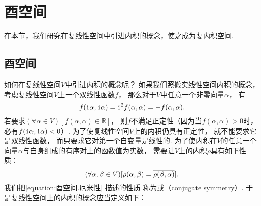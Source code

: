 \section{酉空间}
在本节，我们研究在复线性空间中引进内积的概念，使之成为复内积空间.

\subsection{酉空间}
如何在复线性空间\(V\)中引进内积的概念呢？
如果我们照搬实线性空间内积的概念，
考虑复线性空间\(V\)上一个双线性函数\(f\)，
那么对于\(V\)中任意一个非零向量\(\alpha\)，
有\begin{equation*}
	f(\kern1pt\mathrm{i}\kern1pt\alpha,\kern1pt\mathrm{i}\kern1pt\alpha)
	= \kern1pt\mathrm{i}\kern1pt^2 f(\alpha,\alpha)
	= -f(\alpha,\alpha).
\end{equation*}
若要求\((\forall \alpha \in V)[f(\alpha,\alpha) \in \mathbb{R}]\)，
则\(f\)不满足正定性（因为当\(f(\alpha,\alpha) > 0\)时，必有\(f(\kern1pt\mathrm{i}\kern1pt\alpha,\kern1pt\mathrm{i}\kern1pt\alpha) < 0\)）.
为了使复线性空间\(V\)上的内积仍具有正定性，
就不能要求它是双线性函数，
而只要求它对第一个自变量是线性的.
为了使内积在\(V\)的任意一个向量\(\alpha\)与自身组成的有序对上的函数值为实数，
需要让\(V\)上的内积\(\rho\)具有如下性质：
\begin{equation}\label{equation:酉空间.厄米性}
	(\forall \alpha,\beta \in V)
	[
		\rho(\alpha,\beta)
		= \overline{\rho(\beta,\alpha)}
	].
\end{equation}
我们把\cref{equation:酉空间.厄米性} 描述的性质
称为或（conjugate symmetry）.
于是复线性空间上的内积的概念应当定义如下：
